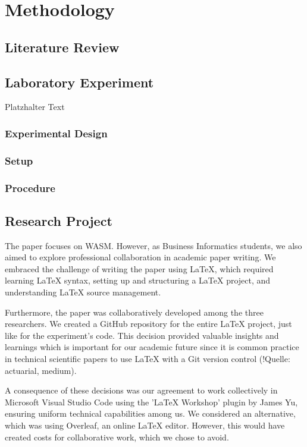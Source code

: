 \newpage

\section{Methodology} \label{methodology}
\subsection{Literature Review}

\subsection{Laboratory Experiment}
Platzhalter Text
\subsubsection{Experimental Design}

\subsubsection{Setup}

\subsubsection{Procedure}

\subsection{Research Project}
    The paper focuses on WASM. However, as Business Informatics students, we also aimed to explore professional collaboration in academic paper writing. We embraced the challenge of writing the paper using LaTeX, which required learning LaTeX syntax, setting up and structuring a LaTeX project, and understanding LaTeX source management.

    Furthermore, the paper was collaboratively developed among the three researchers. We created a GitHub repository for the entire LaTeX project, just like for the experiment's code. This decision provided valuable insights and learnings which is important for our academic future since it is common practice in technical scientific papers to use LaTeX with a Git version control (!Quelle: actuarial, medium).

    A consequence of these decisions was our agreement to work collectively in Microsoft Visual Studio Code using the 'LaTeX Workshop' plugin by James Yu, ensuring uniform technical capabilities among us. We considered an alternative, which was using Overleaf, an online LaTeX editor. However, this would have created costs for collaborative work, which we chose to avoid.

